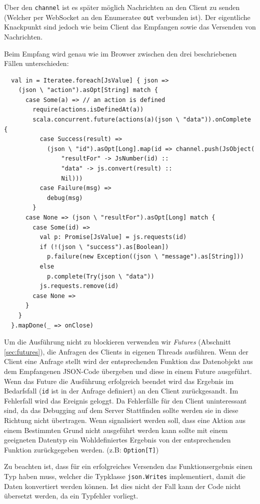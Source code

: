 Über den \texttt{channel} ist es später möglich Nachrichten an den Client zu senden (Welcher per
WebSocket an den Enumeratee \texttt{out} verbunden ist). Der eigentliche Knackpunkt sind jedoch wie
beim Client das Empfangen sowie das Versenden von Nachrichten.

Beim Empfang wird genau wie im Browser zwischen den drei beschriebenen Fällen unterschieden:

\begin{lstlisting}
  val in = Iteratee.foreach[JsValue] { json =>    
    (json \ "action").asOpt[String] match {
      case Some(a) => // an action is defined    
        require(actions.isDefinedAt(a))
        scala.concurrent.future(actions(a)(json \ "data")).onComplete {
          case Success(result) =>
            (json \ "id").asOpt[Long].map(id => channel.push(JsObject(
                "resultFor" -> JsNumber(id) ::
                "data" -> js.convert(result) ::
                Nil)))
          case Failure(msg) =>
            debug(msg)
        }
      case None => (json \ "resultFor").asOpt[Long] match {
        case Some(id) =>          
          val p: Promise[JsValue] = js.requests(id)
          if (!(json \ "success").as[Boolean])
            p.failure(new Exception((json \ "message").as[String]))
          else
            p.complete(Try(json \ "data"))
          js.requests.remove(id)
        case None =>
      }
    }
  }.mapDone(_ => onClose)
\end{lstlisting}

Um die Ausführung nicht zu blockieren verwenden wir \textit{Futures} (Abschnitt\,\ref{sec:futures}),
die Anfragen des Clients in eigenen Threads ausführen. Wenn der Client eine Anfrage stellt wird der
entsprechenden Funktion das Datenobjekt aus dem Empfangenen JSON-Code übergeben und diese in einem
Future ausgeführt. Wenn das Future die Ausführung erfolgreich beendet wird das Ergebnis im
Bedarfsfall (\texttt{id} ist in der Anfrage definiert) an den Client zurückgesandt. Im Fehlerfall
wird das Ereignis geloggt. Da Fehlerfälle für den Client uninteressant sind, da das Debugging auf
dem Server Stattfinden sollte werden sie in diese Richtung nicht übertragen. Wenn signalisiert
werden soll, dass eine Aktion aus einem Bestimmten Grund nicht ausgeführt werden kann sollte mit
einem geeigneten Datentyp ein Wohldefiniertes Ergebnis von der entsprechenden Funktion zurückgegeben
werden. (z.B: \texttt{Option[T]})

Zu beachten ist, dass für ein erfolgreiches Versenden das Funktionsergebnis einen Typ haben muss,
welcher die Typklasse \texttt{json.Writes} implementiert, damit die Daten konvertiert werden können.
Ist dies nicht der Fall kann der Code nicht übersetzt werden, da ein Typfehler vorliegt.

